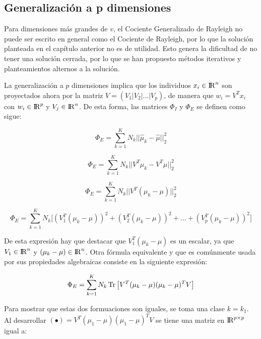 \subsection{Generalización a p dimensiones}

Para dimensiones más grandes de $v$, el Cociente Generalizado de Rayleigh no puede ser escrito en general como el Cociente de Rayleigh, por lo que la solución planteada en el capítulo anterior no es de utilidad. Esto genera la dificultad de no tener una solución cerrada, por lo que se han propuesto métodos iterativos y planteamientos alternos a la solución.

La generalización a $p$ dimensiones implica que los individuos $x_i \in {\rm I\!R}^{n}$ son proyectados ahora por la matriz $V = (V_1 | V_2 | ... |V_p)$, de manera que $w_i = V^T x_i$ con $w_i \in {\rm I\!R}^{p}$ y $V_j \in {\rm I\!R}^{n}$. De esta forma, las matrices $\Phi_I$ y $\Phi_E$ se definen como sigue:

\begin{equation*}
\Phi_E = \sum\limits_{k = 1}^{K} N_{k} ||\widehat{\mu}_k - \widehat{\mu}||_2^2
\end{equation*}

\begin{equation*}
\Phi_E = \sum\limits_{k = 1}^{K} N_{k} ||V^T \mu_k - V^T \mu||_2^2
\end{equation*}

\begin{equation*}
\Phi_E = \sum\limits_{k = 1}^{K} N_{k} ||V^T (\mu_k - \mu)||_2^2
\end{equation*}


\begin{equation}\label{eq:2.17}
  \Phi_E = \sum\limits_{k = 1}^{K} N_{k} \big[ (V_1^T (\mu_k - \mu))^2 + (V_2^T (\mu_k - \mu))^2+ ... + (V_p^T (\mu_k - \mu))^2 \big]
\end{equation}

De esta expresión hay que destacar que $V_1^T (\mu_k - \mu)$ es un escalar, ya que $V_1 \in {\rm I\!R}^n$ y $(\mu_k - \mu) \in {\rm I\!R}^{n}$. Otra fórmula equivalente y que es comúnmente usada por sus propiedades algebraicas consiste en la siguiente expresión:

\begin{equation}\label{eq:2.18}
\Phi_E = \sum\limits_{k = 1}^{K} N_{k} \operatorname{Tr} \big[ V^T (\mu_k - \mu) (\mu_k - \mu)^T V \big]	
\end{equation}

Para mostrar que estas dos formuaciones son iguales, se toma una clase $k = k_1$.  Al desarrollar $(\bullet) = V^T (\mu_1 - \mu) (\mu_1 - \mu)^T V$ se tiene una matriz en ${\rm I\!R}^{p \times p}$ igual a:


